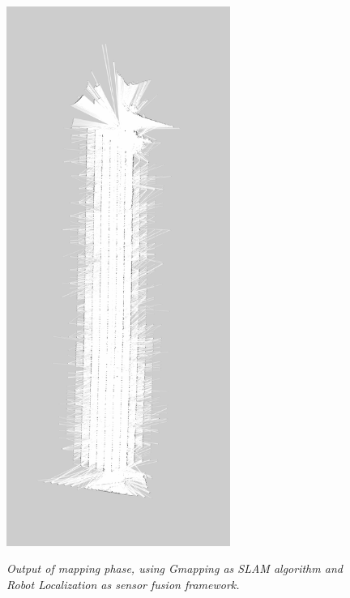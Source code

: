 \begin{figure}
\begin{minipage}[c]{.5\textwidth}
{		\includegraphics[width=0.65\textwidth]{Images/experimental_data/toscana_map.png}
		\label{fig:mapResult_toscana}}
	\end{minipage}
	\caption{\textit{Output of mapping phase, using Gmapping as \ac{SLAM} algorithm and Robot Localization as sensor fusion framework.}}
	\label{fig:sensorFusionInputs}
\end{figure}


